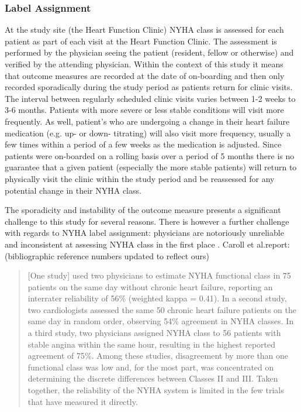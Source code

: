 \documentclass[]{article}
\begin{document}
\subsubsection{Label Assignment}

At the study site (the Heart Function Clinic) NYHA class is assessed for each patient as part of each visit at the Heart Function Clinic. The assessment is performed by the physician seeing the patient (resident, fellow or otherwise) and verified by the attending physician. Within the context of this study it means that outcome measures are recorded at the date of on-boarding and then only recorded sporadically during the study period as patients return for clinic visits. The interval between regularly scheduled clinic visits varies between 1-2 weeks to 3-6 months. Patients with more severe or less stable conditions will visit more frequently. As well, patient's who are undergoing a change in their heart failure medication (e.g. up- or down- titrating) will also visit more frequency, usually a few times within a period of a few weeks as the medication is adjusted. Since patients were on-boarded on a rolling basis over a period of 5 months there is no guarantee that a given patient (especially the more stable patients) will return to physically visit the clinic within the study period and be reassessed for any potential change in their NYHA class. %

The sporadicity and instability of the outcome measure presents a significant challenge to this study for several reasons. There is however a further challenge with regards to NYHA label assignment: physicians are notoriously unreliable and inconsistent at assessing NYHA class in the first place \cite{Carroll2014,Goldman1981a,Christensen2006,Raphael2007a,Kubo2004}. Caroll et al.\@ report: (bibliographic reference numbers updated to reflect ours)

\blockquote{[One study] used two physicians to estimate NYHA functional class in 75 patients on the same day without chronic heart failure, reporting an interrater reliability of 56\% (weighted kappa = 0.41)\cite{Goldman1981a}. In a second study, two cardiologists assessed the same 50 chronic heart failure patients on the same day in random order, observing 54\% agreement in NYHA classes\cite{Raphael2007a}. In a third study, two physicians assigned NYHA class to 56 patients with stable angina within the same hour, resulting in the highest reported agreement of 75\%\cite{Christensen2006}. Among these studies, disagreement by more than one functional class was low and, for the most part, was concentrated on determining the discrete differences between Classes II and III. Taken together, the reliability of the NYHA system is limited in the few trials that have measured it directly. \cite{Carroll2014}}
\end{document}
